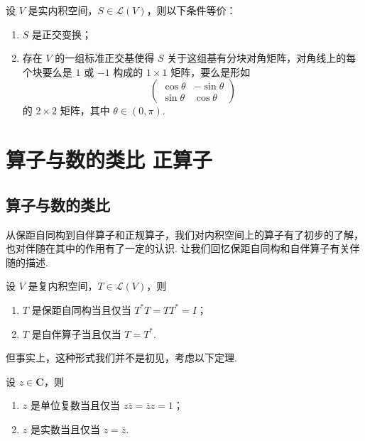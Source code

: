 \begin{theorem}{}{}
    设 $ V $ 是实内积空间，$ S \in \mathcal{L}(V) $，则以下条件等价：
    \begin{enumerate}
        \item $ S $ 是正交变换；

        \item 存在 $ V $ 的一组标准正交基使得 $ S $ 关于这组基有分块对角矩阵，对角线上的每个块要么是 $ 1 $ 或 $ -1 $ 构成的 $ 1 \times 1 $ 矩阵，要么是形如
              \[
                  \begin{pmatrix}
                      \cos \theta & -\sin \theta \\
                      \sin \theta & \cos \theta
                  \end{pmatrix}
              \]
              的 $ 2 \times 2 $ 矩阵，其中 $ \theta \in (0, \pi) $.
    \end{enumerate}
\end{theorem}

\section{算子与数的类比 \quad 正算子}

\subsection{算子与数的类比}

从保距自同构到自伴算子和正规算子，我们对内积空间上的算子有了初步的了解，也对伴随在其中的作用有了一定的认识. 让我们回忆保距自同构和自伴算子有关伴随的描述.

\begin{theorem}{}{}
    设 $ V $ 是复内积空间，$ T \in \mathcal{L}(V) $，则
    \begin{enumerate}
        \item $ T $ 是保距自同构当且仅当 $ T^*T = TT^* = I $；

        \item $ T $ 是自伴算子当且仅当 $ T = T^* $.
    \end{enumerate}
\end{theorem}

但事实上，这种形式我们并不是初见，考虑以下定理.

\begin{theorem}{}{}
    设 $ z \in \mathbf{C} $，则
    \begin{enumerate}
        \item $ z $ 是单位复数当且仅当 $ z\bar{z} = \bar{z}z = 1 $；

        \item $ z $ 是实数当且仅当 $ z = \bar{z} $.
    \end{enumerate}
\end{theorem}

